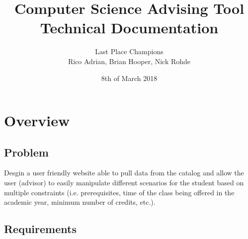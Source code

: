 \documentclass[letterpaper]{report}
\title{Computer Science Advising Tool \\ Technical Documentation}
\author{Last Place Champions \\ Rico Adrian, Brian Hooper, Nick Rohde}
\date{8th of March 2018}
\begin{document}
	\maketitle
	\tableofcontents
	\pagebreak
	\chapter{Overview}
	\section{Problem}
	Desgin a user friendly website able to pull data from the catalog and allow the user (advisor) to easily manipulate different scenarios for the student based on multiple constraints (i.e. prerequisites, time of the class	being offered in the academic year, minimum number of credits, etc.).
	\section{Requirements}
\end{document}
